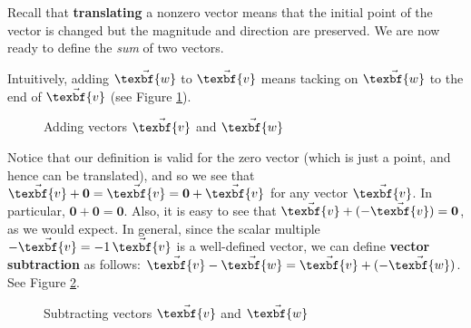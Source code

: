 Recall that \textbf{translating} a nonzero vector means that the initial point of the vector
is changed but the magnitude and direction are preserved. We are now ready to define
the \emph{sum} of two vectors.

\newpage
Intuitively, adding $\vec{\texbf{w}}$ to $\vec{\texbf{v}}$ means tacking on $\vec{\texbf{w}}$ to the end of $\vec{\texbf{v}}$ (see Figure
\ref{fig:sum}).

\begin{figure}[h]
 \centering
 \qquad
 \qquad
 \caption[]{\quad Adding vectors $\vec{\texbf{v}}$ and $\vec{\texbf{w}}$}
 \label{fig:sum}
\end{figure}

Notice that our definition is valid for the zero vector (which is just a point, and hence can be translated), and
so we see that $\vec{\texbf{v}} + \textbf{0} = \vec{\texbf{v}} = \textbf{0} + \vec{\texbf{v}}$ for any vector $\vec{\texbf{v}}$. In
particular, $\textbf{0} + \textbf{0} = \textbf{0}$. Also, it is easy to see that $\vec{\texbf{v}} + (-\vec{\texbf{v}}) =
\textbf{0}$, as we would expect. In general, since the scalar multiple $-\vec{\texbf{v}} = -1 \,\vec{\texbf{v}}$ is a
well-defined vector, we can define \textbf{vector subtraction} as follows:
$\vec{\texbf{v}} - \vec{\texbf{w}} = \vec{\texbf{v}} + (-\vec{\texbf{w}})$. See Figure \ref{fig:subtract}.

\begin{figure}[h]
 \centering
 \qquad
 \qquad
 \caption[]{\quad Subtracting vectors $\vec{\texbf{v}}$ and $\vec{\texbf{w}}$}
 \label{fig:subtract}
\end{figure}

